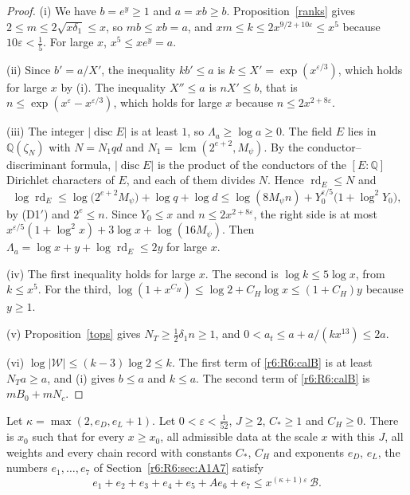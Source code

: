 \begin{proof}
(i) We have $b=e^{y}\ge1$ and $a=xb\ge b$. Proposition~\ref{ranks} gives $2\le m\le2\sqrt{x\delta_1}\le x$, so $mb\le xb=a$, and $xm\le k\le2x^{9/2+10\varepsilon}\le x^5$ because $10\varepsilon<\frac15$. For large $x$, $x^5\le xe^{y}=a$.

(ii) Since $b'=a/X'$, the inequality $kb'\le a$ is $k\le X'=\exp(x^{\varepsilon/3})$, which holds for large $x$ by (i). The inequality $X''\le a$ is $nX'\le b$, that is $n\le\exp(x^{\varepsilon}-x^{\varepsilon/3})$, which holds for large $x$ because $n\le2x^{2+8\varepsilon}$.

(iii) The integer $\lvert\operatorname{disc}E\rvert$ is at least $1$, so $\Lambda_a\ge\log a\ge0$. The field $E$ lies in $\mathbb Q(\zeta_N)$ with $N=N_1qd$ and $N_1=\operatorname{lcm}(2^{e+2},M_\psi)$. By the conductor--discriminant formula, $\lvert\operatorname{disc}E\rvert$ is the product of the conductors of the $[E:\mathbb Q]$ Dirichlet characters of $E$, and each of them divides $N$. Hence $\operatorname{rd}_E\le N$ and
\[
\log\operatorname{rd}_E\le\log\big(2^{e+2}M_\psi\big)+\log q+\log d\le\log(8M_\psi n)+Y_0^{\varepsilon/5}\big(1+\log^2Y_0\big),
\]
by (D1$'$) and $2^e\le n$. Since $Y_0\le x$ and $n\le2x^{2+8\varepsilon}$, the right side is at most $x^{\varepsilon/5}(1+\log^2x)+3\log x+\log(16M_\psi)$. Then $\Lambda_a=\log x+y+\log\operatorname{rd}_E\le2y$ for large $x$.

(iv) The first inequality holds for large $x$. The second is $\log k\le5\log x$, from $k\le x^5$. For the third, $\log(1+x^{C_H})\le\log2+C_H\log x\le(1+C_H)y$ because $y\ge1$.

(v) Proposition~\ref{tops} gives $N_T\ge\frac12\delta_1n\ge1$, and $0<a_t\le a+a/(kx^{13})\le2a$.

(vi) $\log\lvert\mathcal W\rvert\le(k-3)\log2\le k$. The first term of \eqref{r6:R6:calB} is at least $N_Ta\ge a$, and (i) gives $b\le a$ and $k\le a$. The second term of \eqref{r6:R6:calB} is $mB_0+mN_c$.
\end{proof}

\begin{proposition}\label{r6:R6:prop:errors}
Let $\kappa=\max(2,e_D,e_L+1)$. Let $0<\varepsilon<\frac1{52}$, $J\ge2$, $C_\ast\ge1$ and $C_H\ge0$. There is $x_0$ such that for every $x\ge x_0$, all admissible data at the scale $x$ with this $J$, all weights and every chain record with constants $C_\ast$, $C_H$ and exponents $e_D$, $e_L$, the numbers $e_1,\dots,e_7$ of Section~\ref{r6:R6:sec:A1A7} satisfy
\[
e_1+e_2+e_3+e_4+e_5+Ae_6+e_7\le x^{(\kappa+1)\varepsilon}\,\mathcal B .
\]
\end{proposition}

